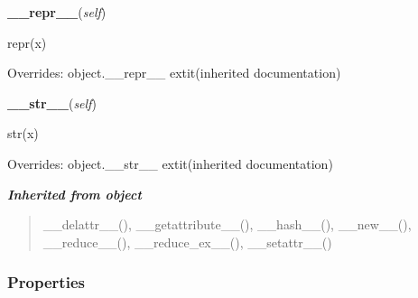     \vspace{0.5ex}

\hspace{.8\funcindent}\begin{boxedminipage}{\funcwidth}

    \raggedright \textbf{\_\_repr\_\_}(\textit{self})

\setlength{\parskip}{2ex}
    repr(x)

\setlength{\parskip}{1ex}
      Overrides: object.\_\_repr\_\_ 	extit{(inherited documentation)}

    \end{boxedminipage}

    \vspace{0.5ex}

\hspace{.8\funcindent}\begin{boxedminipage}{\funcwidth}

    \raggedright \textbf{\_\_str\_\_}(\textit{self})

\setlength{\parskip}{2ex}
    str(x)

\setlength{\parskip}{1ex}
      Overrides: object.\_\_str\_\_ 	extit{(inherited documentation)}

    \end{boxedminipage}


\large{\textbf{\textit{Inherited from object}}}

\begin{quote}
\_\_delattr\_\_(), \_\_getattribute\_\_(), \_\_hash\_\_(), \_\_new\_\_(), \_\_reduce\_\_(), \_\_reduce\_ex\_\_(), \_\_setattr\_\_()
\end{quote}


  \subsubsection{Properties}

